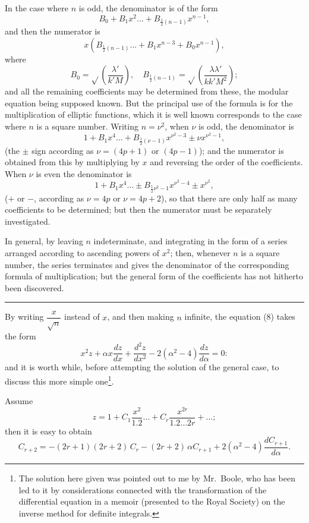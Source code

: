 \documentclass[12pt,a4paper]{article}
\theoremstyle{plain}
\begin{document}
In the case where $n$ is odd, the denominator is of the form
\[
B_0 + B_1 x^2 \ldots + B_{\frac{1}{2}(n-1)} x^{n-1},
\]
and then the numerator is
\[
x (B_{\frac{1}{2}(n-1)} \ldots + B_1 x^{n-3} + B_0 x^{n-1}),
\]
where
\[
B_0 = \sqrt{}\left(\frac{\lambda'}{k' M}\right), \quad B_{\frac{1}{2}(n-1)} = \sqrt{}\left(\frac{\lambda \lambda'}{k k' M^2}\right);
\]
and all the remaining coefficients may be determined from these, the modular equation being supposed known. But the principal use of the formula is for the multiplication of elliptic functions, which it is well known corresponds to the case where $n$ is a square number. Writing $n = \nu^2$, when $\nu$ is odd, the denominator is
\[
1 + B_1 x^4 \ldots + B_{\frac{1}{2}(\nu-1)} x^{\nu^2-3} \pm \nu x^{\nu^2-1},
\]
(the $\pm$ sign according as $\nu = (4p+1)$ or $(4p-1)$); and the numerator is obtained from this by multiplying by $x$ and reversing the order of the coefficients. When $\nu$ is even the denominator is
\[
1 + B_1 x^4 \ldots \pm B_{\frac{1}{2}\nu^2-1} x^{\nu^2-4} \pm x^{\nu^2},
\]
($+$ or $-$, according as $\nu = 4p$ or $\nu = 4p + 2$), so that there are only half as many coefficients to be determined; but then the numerator must be separately investigated.


In general, by leaving $n$ indeterminate, and integrating in the form of a series arranged according to ascending powers of $x^2$; then, whenever $n$ is a square number, the series terminates and gives the denominator of the corresponding formula of multiplication; but the general form of the coefficients has not hitherto been discovered.

\bigskip
\hrule
\bigskip

By writing $\dfrac{x}{\sqrt{n}}$ instead of $x$, and then making $n$ infinite, the equation (8) takes the form
\[
x^2 z + \alpha x \frac{dz}{dx} + \frac{d^2 z}{dx^2} - 2(\alpha^2 - 4)\frac{dz}{d\alpha} = 0 \tag{9}:
\]
and it is worth while, before attempting the solution of the general case, to discuss this more simple one\footnote{The solution here given was pointed out to me by Mr.~Boole, who has been led to it by considerations connected with the transformation of the differential equation in a memoir (presented to the Royal Society) on the inverse method for definite integrals.}.

Assume
\[
z = 1 + C_1 \frac{x^2}{1.2} \ldots + C_r \frac{x^{2r}}{1.2 \ldots 2r} + \ldots;
\]
then it is easy to obtain
\[
C_{r+2} = -(2r+1)(2r+2)\,C_r - (2r+2)\,\alpha C_{r+1} + 2(\alpha^2 - 4)\frac{dC_{r+1}}{d\alpha}.
\]
\end{document}
